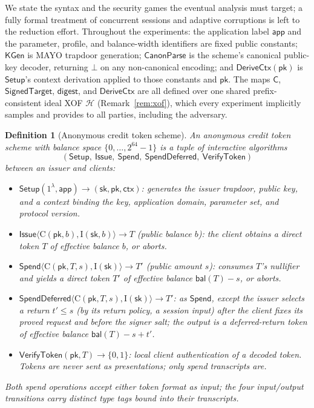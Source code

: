 \documentclass[11pt]{article}
\newtheorem{definition}{Definition}
\newcommand{\ctx}{\mathsf{ctx}}
\newcommand{\Cred}{\mathsf{C}}
\begin{document}
We state the syntax and the security games the eventual analysis must
target; a fully formal treatment of concurrent sessions and adaptive
corruptions is left to the reduction effort. Throughout the experiments:
the application label $\mathsf{app}$ and the parameter, profile, and
balance-width identifiers are fixed public constants; $\mathsf{KGen}$ is
MAYO trapdoor generation; $\mathsf{CanonParse}$ is the scheme's canonical
public-key decoder, returning $\bot$ on any non-canonical encoding; and
$\mathsf{DeriveCtx}(\mathsf{pk})$ is $\mathsf{Setup}$'s context derivation
applied to those constants and $\mathsf{pk}$. The maps $\Cred$,
$\mathsf{SignedTarget}$,
$\mathsf{digest}$, and $\mathsf{DeriveCtx}$ are all defined over one
shared prefix-consistent ideal XOF $\mathcal{H}$
(Remark~\ref{rem:xof}), which every experiment implicitly samples and
provides to all parties, including the adversary.

\begin{definition}[Anonymous credit token scheme]
\label{def:syntax}
An \emph{anonymous credit token scheme} with balance space
$\{0,\dots,2^{64}{-}1\}$ is a tuple of interactive algorithms
\[
(\mathsf{Setup},\ \mathsf{Issue},\ \mathsf{Spend},\
\mathsf{SpendDeferred},\ \mathsf{VerifyToken})
\]
between an issuer and clients:
\begin{itemize}
  \item $\mathsf{Setup}(1^\lambda, \mathsf{app}) \to
  (\mathsf{sk}, \mathsf{pk}, \ctx)$: generates the issuer trapdoor, public
  key, and a context binding the key, application domain, parameter set,
  and protocol version.
  \item $\mathsf{Issue}\langle \mathrm{C}(\mathsf{pk}, b),
  \mathrm{I}(\mathsf{sk}, b) \rangle \to T$ (public balance $b$): the client
  obtains a \emph{direct token} $T$ of effective balance $b$, or aborts.
  \item $\mathsf{Spend}\langle \mathrm{C}(\mathsf{pk}, T, s),
  \mathrm{I}(\mathsf{sk}) \rangle \to T'$ (public amount $s$): consumes
  $T$'s nullifier and yields a direct token $T'$ of effective balance
  $\mathsf{bal}(T) - s$, or aborts.
  \item $\mathsf{SpendDeferred}\langle \mathrm{C}(\mathsf{pk}, T, s),
  \mathrm{I}(\mathsf{sk}) \rangle \to T'$: as $\mathsf{Spend}$, except
  the issuer selects a return $t' \le s$ (by its return policy, a session
  input) after the client fixes its proved request and before the signer salt;
  the output is a
  \emph{deferred-return token} of effective balance
  $\mathsf{bal}(T) - s + t'$.
  \item $\mathsf{VerifyToken}(\mathsf{pk}, T) \to \{0,1\}$: local client
  authentication of a decoded token. Tokens are never sent as
  presentations; only spend transcripts are.
\end{itemize}
Both spend operations accept either token format as input; the four
input/output transitions carry distinct type tags bound into their
transcripts.
\end{definition}
\end{document}
